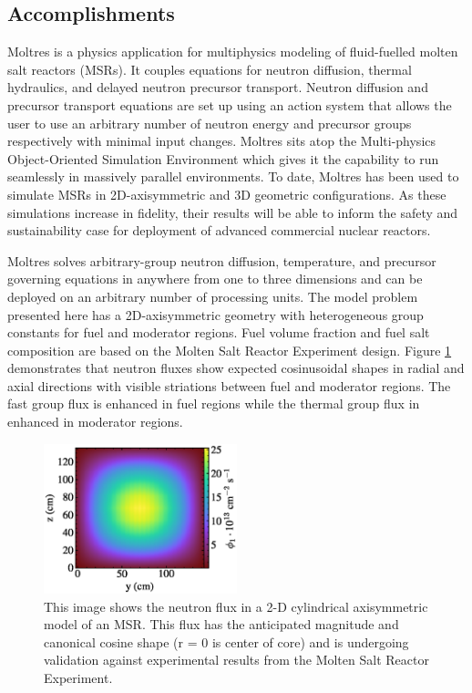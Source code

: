 \documentclass[letterpaper]{article}
\begin{document}
\subsection{Accomplishments} 
Moltres \cite{lindsay_arfc/moltres:_2017} is
a physics application for multiphysics modeling of fluid-fuelled molten salt
reactors (MSRs). It couples equations for neutron diffusion, thermal
hydraulics, and delayed neutron precursor transport. Neutron diffusion and
precursor transport equations are set up using an action system that allows the
user to use an arbitrary number of neutron energy and precursor groups
respectively with minimal input changes. Moltres sits atop the Multi-physics
Object-Oriented Simulation Environment \cite{gaston_moose:_2009} which gives it the
capability to run seamlessly in massively parallel environments. To date,
Moltres has been used to simulate MSRs in 2D-axisymmetric and 3D geometric
configurations. As these simulations increase in fidelity, their results will
be able to inform the safety and sustainability case for deployment of advanced
commercial nuclear reactors.

Moltres solves arbitrary-group neutron diffusion, temperature, and precursor
governing equations in anywhere from one to three dimensions and can be
deployed on an arbitrary number of processing units. The model problem
presented here has a 2D-axisymmetric geometry with heterogeneous group
constants for fuel and moderator regions. Fuel volume fraction and fuel salt
composition are based on the Molten Salt Reactor Experiment design. Figure 
\ref{fig:flux} demonstrates that neutron
fluxes show expected cosinusoidal shapes in radial and axial directions with
visible striations between fuel and moderator regions. The fast group flux is
enhanced in fuel regions while the thermal group flux in enhanced in moderator
regions. 

\begin{figure}[htb]
        \begin{center}
                \includegraphics[width=0.5\textwidth]{flux.eps}
        \end{center}
        \caption{This image shows the neutron flux in a 2-D cylindrical 
        axisymmetric model of an MSR. This flux has the anticipated magnitude 
and canonical cosine shape (r = 0 is center of core) and is undergoing 
validation against experimental results from the Molten Salt Reactor 
Experiment.}%
        \label{fig:flux}
\end{figure}
\end{document}
